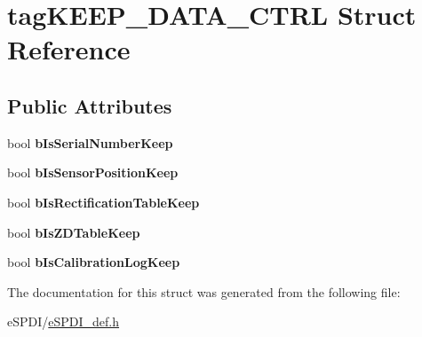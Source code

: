 \hypertarget{structtag_k_e_e_p___d_a_t_a___c_t_r_l}{}\section{tag\+K\+E\+E\+P\+\_\+\+D\+A\+T\+A\+\_\+\+C\+T\+RL Struct Reference}
\label{structtag_k_e_e_p___d_a_t_a___c_t_r_l}
\subsection*{Public Attributes}
\begin{DoxyCompactItemize}
\item 
\mbox{\label{structtag_k_e_e_p___d_a_t_a___c_t_r_l_acac55f3adb6aceb69d1c3187d6e38288}} 
bool {\bfseries b\+Is\+Serial\+Number\+Keep}
\item 
\mbox{\label{structtag_k_e_e_p___d_a_t_a___c_t_r_l_aab0d9e73b95ee7a8672c76dd8a8f9445}} 
bool {\bfseries b\+Is\+Sensor\+Position\+Keep}
\item 
\mbox{\label{structtag_k_e_e_p___d_a_t_a___c_t_r_l_a18510fead149b054bdff713ffd4a658e}} 
bool {\bfseries b\+Is\+Rectification\+Table\+Keep}
\item 
\mbox{\label{structtag_k_e_e_p___d_a_t_a___c_t_r_l_ae72186b58edbdc923ec88a9dcf84e32b}} 
bool {\bfseries b\+Is\+Z\+D\+Table\+Keep}
\item 
\mbox{\label{structtag_k_e_e_p___d_a_t_a___c_t_r_l_a756902f208fc806c9d448fcae1f732b2}} 
bool {\bfseries b\+Is\+Calibration\+Log\+Keep}
\end{DoxyCompactItemize}


The documentation for this struct was generated from the following file\+:\begin{DoxyCompactItemize}
\item 
e\+S\+P\+D\+I/\hyperlink{e_s_p_d_i__def_8h}{e\+S\+P\+D\+I\+\_\+def.\+h}\end{DoxyCompactItemize}
